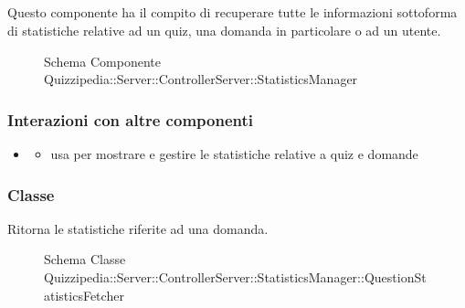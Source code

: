 \subsection{}
Questo componente ha il compito di recuperare tutte le informazioni sottoforma di statistiche relative ad un quiz, una domanda in particolare o ad un utente.
\begin{figure}[H]
\centering
\noindent{}
\caption[Schema Componente Quizzipedia::Server::ControllerServer::StatisticsManager]{Schema Componente Quizzipedia::Server::ControllerServer::StatisticsManager}
\end{figure}
\subsubsection{Interazioni con altre componenti}
\begin{itemize}
\item {}
\begin{itemize}
\item usa  per mostrare e gestire le statistiche relative a quiz e domande
\end{itemize}
\end{itemize}
\subsubsection{Classe }
Ritorna le statistiche riferite ad una domanda.
\begin{figure}[H]
\centering
\noindent{}
\caption[Schema Classe QuestionStatisticsFetcher]{Schema Classe Quizzipedia::Server::ControllerServer::StatisticsManager::QuestionStatisticsFetcher}
\end{figure}
